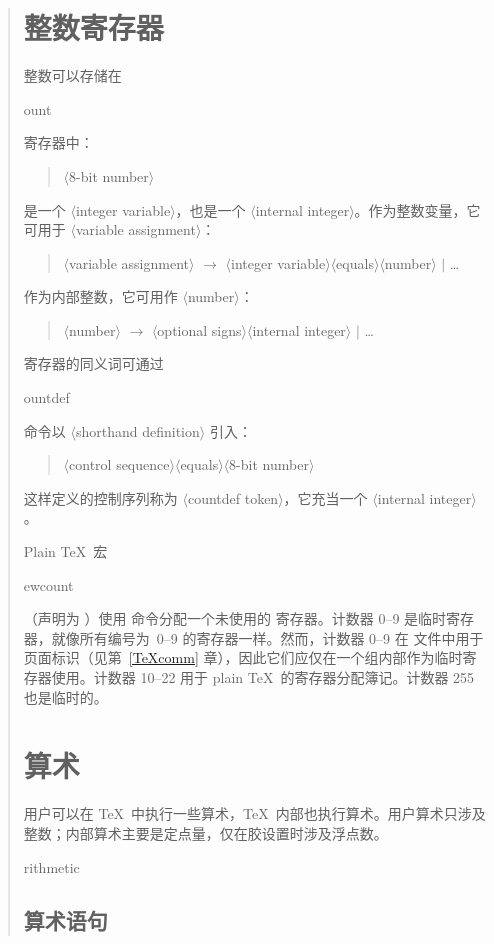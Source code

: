 \documentclass[a4paper]{rapport3}
\makeatletter
\def\gr#1{$\langle$#1$\rangle$}\def\key#1{{\tt#1}}
\newenvironment{disp}{\begin{quotation}}{\end{quotation}}
\newenvironment{Disp}{\begin{quotation}}{\end{quotation}}
\def\term#1\par{\index{#1}}
\def\cstoidx#1\par{\index{#1@\cs{#1}}}
\def\csidx#1{\cstoidx #1\par\cs{#1}}
\makeatother
\begin{document}
\begin{disp}
\section{整数寄存器}

整数可以存储在 \csidx{count} 寄存器中：
\begin{Disp}\gr{8-bit number}\end{Disp}
是一个 \gr{integer variable}，也是一个 \gr{internal integer}。作为整数变量，它可用于 \gr{variable assignment}：
\begin{Disp}\gr{variable assignment} $\longrightarrow$
     \gr{integer variable}\gr{equals}\gr{number} $|$ \dots\end{Disp}
\awp
作为内部整数，它可用作 \gr{number}：
\begin{Disp}\gr{number} $\rightarrow$ \gr{optional signs}\gr{internal integer}
     $|$ \dots
\end{Disp}

 寄存器的同义词可通过 \csidx{countdef} 命令以 \gr{shorthand definition} 引入：
\begin{Disp}\gr{control sequence}\gr{equals}\gr{8-bit number}
\end{Disp}
这样定义的控制序列称为 \gr{countdef token}，它充当一个 \gr{internal integer}。

Plain \TeX\ 宏 \csidx{newcount}（声明为 ）使用  命令分配一个未使用的  寄存器。计数器 0--9 是临时寄存器，就像所有编号为~0--9 的寄存器一样。然而，计数器 0--9 在  文件中用于页面标识（见第~\ref{TeXcomm} 章），因此它们应仅在一个组内部作为临时寄存器使用。计数器 10--22 用于 plain \TeX\ 的寄存器分配簿记。计数器 255 也是临时的。

\section{算术}

用户可以在 \TeX\ 中执行一些算术，\TeX\ 内部也执行算术。用户算术只涉及整数；内部算术主要是定点量，仅在胶设置时涉及浮点数。
\term arithmetic\par

\subsection{算术语句}


\end{disp}
\end{document}
